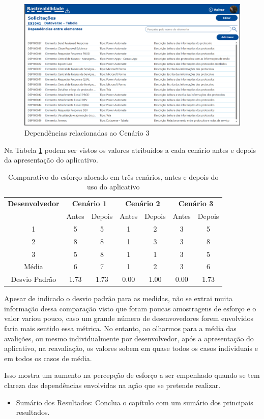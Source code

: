 	\begin{figure}[!h]
		\centering
		\includegraphics[width=1\textwidth]{./figuras/solicitacoesTabela.png}
		\caption{Dependências relacionadas ao Cenário 3}
		\label{fig:resultados:solicitacoesTabela}
	\end{figure}

	Na Tabela \ref{tab:cenarios_desenvolvimento} podem ser vistos os valores atribuídos a cada cenário antes e depois da apresentação do aplicativo.

	\begin{table}[!htb]
		\centering
		\begin{tabular}{c cc cc cc}
			\toprule
			\textbf{Desenvolvedor} & \multicolumn{2}{c}{\textbf{Cenário 1}} & \multicolumn{2}{c}{\textbf{Cenário 2}} & \multicolumn{2}{c}{\textbf{Cenário 3}} \\
			& Antes & Depois & Antes & Depois & Antes & Depois \\
			\midrule
			1 & 5 & 5 & 1 & 2 & 3 & 5 \\
			2 & 8 & 8 & 1 & 3 & 3 & 8 \\
			3 & 5 & 8 & 1 & 1 & 3 & 5 \\
			\midrule
			Média & 6 & 7 & 1 & 2 & 3 & 6 \\
			Desvio Padrão & 1.73 & 1.73 & 0.00 & 1.00 & 0.00 & 1.73 \\
			\bottomrule
		\end{tabular}
		\caption{Comparativo do esforço alocado em três cenários, antes e depois do uso do aplicativo}
		\label{tab:cenarios_desenvolvimento}
	\end{table}

	Apesar de indicado o desvio padrão para as medidas, não se extrai muita informação dessa comparação visto que foram poucas amostragens de esforço e o valor variou pouco,
	caso um grande número de desenvovedores forem envolvidos faria mais sentido essa métrica. No entanto, ao olharmos para a média das avalições, ou mesmo individualmente por
	desenvolvedor, após a apresentação do aplicativo, na reavaliação, os valores sobem em quase todos os casos individuais e em todos os casos de média.

	Isso mostra um aumento na percepção de esforço a ser empenhado quando se tem clareza das dependências envolvidas na ação que se pretende realizar.

	
	\begin{itemize}		
		\item {\color{red} Sumário dos Resultados: Conclua o capítulo com um sumário dos principais resultados.}
	\end{itemize}